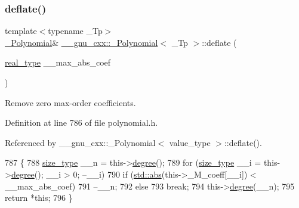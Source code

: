 \subsubsection{\texorpdfstring{deflate()}{deflate()}\hspace{0.1cm}{\footnotesize\ttfamily [1/2]}}
{\footnotesize\ttfamily template$<$typename \+\_\+\+Tp$>$ \\
\hyperlink{class____gnu__cxx_1_1__Polynomial}{\+\_\+\+Polynomial}\& \hyperlink{class____gnu__cxx_1_1__Polynomial}{\+\_\+\+\_\+gnu\+\_\+cxx\+::\+\_\+\+Polynomial}$<$ \+\_\+\+Tp $>$\+::deflate (\begin{DoxyParamCaption}\item[{\hyperlink{class____gnu__cxx_1_1__Polynomial_a656ceaafcb42abd626c253da3284998b}{real\+\_\+type}}]{\+\_\+\+\_\+max\+\_\+abs\+\_\+coef }\end{DoxyParamCaption})\hspace{0.3cm}{\ttfamily [inline]}}

Remove zero max-\/order coefficients. 

Definition at line 786 of file polynomial.\+h.



Referenced by \+\_\+\+\_\+gnu\+\_\+cxx\+::\+\_\+\+Polynomial$<$ value\+\_\+type $>$\+::deflate().


\begin{DoxyCode}
787       \{
788         \hyperlink{class____gnu__cxx_1_1__Polynomial_a8b25fcfd4acaad0c5c08b649c22da28a}{size\_type} \_\_n = this->\hyperlink{class____gnu__cxx_1_1__Polynomial_a07d9933aeeb9afbd823218ed921336cb}{degree}();
789         \textcolor{keywordflow}{for} (\hyperlink{class____gnu__cxx_1_1__Polynomial_a8b25fcfd4acaad0c5c08b649c22da28a}{size\_type} \_\_i = this->\hyperlink{class____gnu__cxx_1_1__Polynomial_a07d9933aeeb9afbd823218ed921336cb}{degree}(); \_\_i > 0; --\_\_i)
790           \textcolor{keywordflow}{if} (\hyperlink{namespace____gnu__cxx_ab9eb9db3560f504f8cd25a71bcb6ead5}{std::abs}(this->\_M\_coeff[\_\_i]) < \_\_max\_abs\_coef)
791             --\_\_n;
792           \textcolor{keywordflow}{else}
793             \textcolor{keywordflow}{break};
794         this->\hyperlink{class____gnu__cxx_1_1__Polynomial_a07d9933aeeb9afbd823218ed921336cb}{degree}(\_\_n);
795         \textcolor{keywordflow}{return} *\textcolor{keyword}{this};
796       \}
\end{DoxyCode}
\mbox{\label{class____gnu__cxx_1_1__Polynomial_a7fa3113b29a710d74beb4ccdaadf4411}} 
